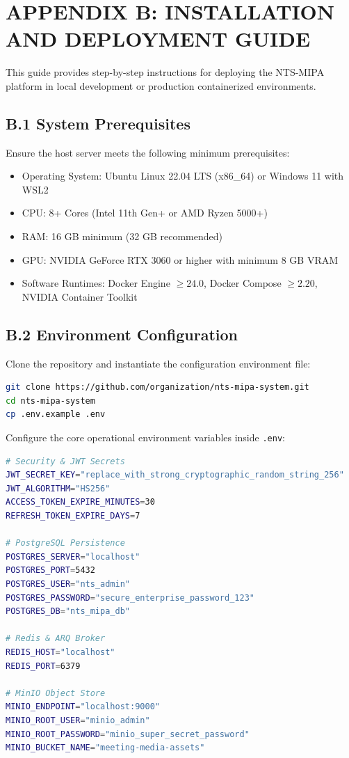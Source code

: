 \documentclass[12pt,a4paper,oneside]{report}
\begin{document}
\clearpage
\chapter*{APPENDIX B: INSTALLATION AND DEPLOYMENT GUIDE}

This guide provides step-by-step instructions for deploying the NTS-MIPA platform in local development or production containerized environments.

\section*{B.1 System Prerequisites}
Ensure the host server meets the following minimum prerequisites:
\begin{itemize}
    \item Operating System: Ubuntu Linux 22.04 LTS (x86\_64) or Windows 11 with WSL2
    \item CPU: 8+ Cores (Intel 11th Gen+ or AMD Ryzen 5000+)
    \item RAM: 16 GB minimum (32 GB recommended)
    \item GPU: NVIDIA GeForce RTX 3060 or higher with minimum 8 GB VRAM
    \item Software Runtimes: Docker Engine $\ge 24.0$, Docker Compose $\ge 2.20$, NVIDIA Container Toolkit
\end{itemize}

\section*{B.2 Environment Configuration}
Clone the repository and instantiate the configuration environment file:
\begin{lstlisting}[language=bash, caption={Cloning and Environment Setup}]
git clone https://github.com/organization/nts-mipa-system.git
cd nts-mipa-system
cp .env.example .env
\end{lstlisting}

Configure the core operational environment variables inside \texttt{.env}:
\begin{lstlisting}[language=bash, caption={Core Environment Variables in .env}]
# Security & JWT Secrets
JWT_SECRET_KEY="replace_with_strong_cryptographic_random_string_256"
JWT_ALGORITHM="HS256"
ACCESS_TOKEN_EXPIRE_MINUTES=30
REFRESH_TOKEN_EXPIRE_DAYS=7

# PostgreSQL Persistence
POSTGRES_SERVER="localhost"
POSTGRES_PORT=5432
POSTGRES_USER="nts_admin"
POSTGRES_PASSWORD="secure_enterprise_password_123"
POSTGRES_DB="nts_mipa_db"

# Redis & ARQ Broker
REDIS_HOST="localhost"
REDIS_PORT=6379

# MinIO Object Store
MINIO_ENDPOINT="localhost:9000"
MINIO_ROOT_USER="minio_admin"
MINIO_ROOT_PASSWORD="minio_super_secret_password"
MINIO_BUCKET_NAME="meeting-media-assets"
\end{lstlisting}
\end{document}
